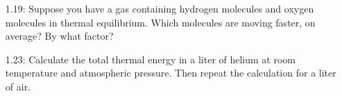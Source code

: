 \documentclass[a4paper, 12pt]{config/homework}
\begin{document}
\begin{enumerate}
\vspace{\baselineskip}
\item[1.19:] Suppose you have a gas containing hydrogen molecules and oxygen molecules in thermal equilibrium. Which molecules are moving faster, on average? By what factor?



\vspace{\baselineskip}
\item[1.23:] Calculate the total thermal energy in a liter of helium at room temperature and atmospheric pressure. Then repeat the calculation for a liter of air.



\end{enumerate}
\end{document}
